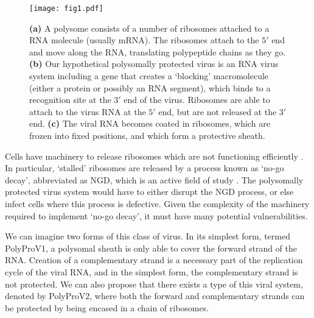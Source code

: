 \documentclass[12pt]{iopart}
\begin{document}
\begin{figure}
\begin{center}
\texttt{[image: fig1.pdf]}
\caption{\label{fig: 1}
{\bf (a)} A polysome consists of a number of ribosomes attached to a RNA molecule (usually mRNA). The ribosomes 
attach to the $5'$ end and move along the RNA, translating polypeptide chains as they go. {\bf (b)}
Our hypothetical polysomally protected virus is an RNA virus system including a gene that creates a \lq blocking' 
macromolecule (either a protein or possibly an RNA segment), 
which binds to a recognition site at the $3'$ end of the virus.  
Ribosomes are able to attach to the virus RNA at the 
$5'$ end, but are not released at the $3'$ end. {\bf (c)} The viral RNA becomes coated in ribosomes, which 
are frozen into fixed positions, and which form a protective sheath. 
}
\end{center}
\end{figure}

Cells have machinery to release ribosomes which are not functioning efficiently \cite{Joa17}. In particular, 
\lq stalled' ribosomes are released by a process known as \lq no-go decay', abbreviated as NGD, 
which is an active field of study \cite{Mat+17,Ren+18,Jus+18,Nav+20}. The polysomally protected 
virus system would have to either disrupt the NGD process, or else infect cells where this process is defective. 
Given the complexity of the machinery required to implement \lq no-go decay', it must have many 
potential vulnerabilities.

We can imagine two forms of this class of virus. In its simplest form, termed PolyProV1, a polysomal sheath 
is only able to cover the forward strand of the RNA. Creation of a complementary strand is a necessary 
part of the replication cycle of the viral RNA, and in the simplest form, the complementary strand 
is not protected. We can also propose that there exists a type of this viral system, denoted by PolyProV2, 
where both the forward and complementary strands can be protected by being encased in a chain of 
ribosomes.
\end{document}
